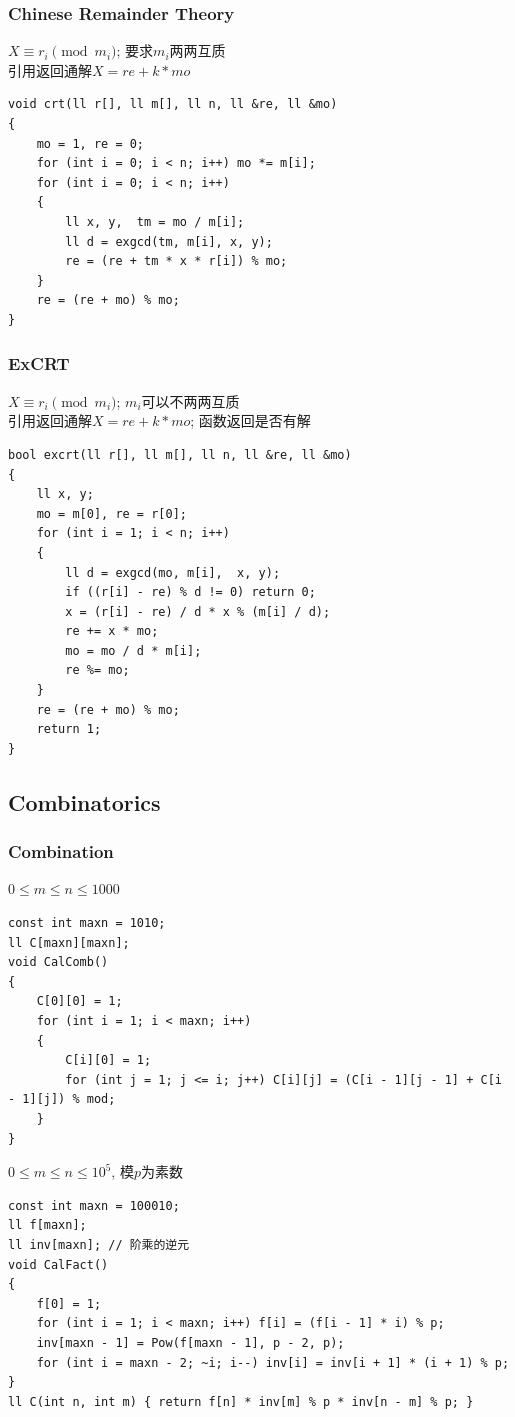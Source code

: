 \documentclass[twoside]{article}
\begin{document}
\subsubsection{Chinese Remainder Theory}

$X \equiv r_i \pmod {m_i}$; 要求$m_i$两两互质\\
引用返回通解$X = re + k * mo$
\begin{lstlisting}
void crt(ll r[], ll m[], ll n, ll &re, ll &mo)
{
    mo = 1, re = 0;
    for (int i = 0; i < n; i++) mo *= m[i];
    for (int i = 0; i < n; i++)
    {
        ll x, y,  tm = mo / m[i];
        ll d = exgcd(tm, m[i], x, y);
        re = (re + tm * x * r[i]) % mo;
    }
    re = (re + mo) % mo;
}
\end{lstlisting}
\subsubsection{ExCRT}

$X \equiv r_i \pmod {m_i}$; $m_i$可以不两两互质\\
引用返回通解$X = re + k * mo$; 函数返回是否有解
\begin{lstlisting}
bool excrt(ll r[], ll m[], ll n, ll &re, ll &mo)
{
    ll x, y;
    mo = m[0], re = r[0];
    for (int i = 1; i < n; i++)
    {
        ll d = exgcd(mo, m[i],  x, y);
        if ((r[i] - re) % d != 0) return 0;
        x = (r[i] - re) / d * x % (m[i] / d);
        re += x * mo;
        mo = mo / d * m[i];
        re %= mo;
    }
    re = (re + mo) % mo;
    return 1;
}
\end{lstlisting}
\subsection{Combinatorics}
\subsubsection{Combination}

$0 \leq m \leq n \leq 1000$
\begin{lstlisting}
const int maxn = 1010;
ll C[maxn][maxn];
void CalComb()
{
    C[0][0] = 1;
    for (int i = 1; i < maxn; i++)
    {
        C[i][0] = 1;
        for (int j = 1; j <= i; j++) C[i][j] = (C[i - 1][j - 1] + C[i - 1][j]) % mod;
    }
}

\end{lstlisting}
$0 \leq m \leq n \leq 10^5$, 模$p$为素数
\begin{lstlisting}
const int maxn = 100010;
ll f[maxn];
ll inv[maxn]; // 阶乘的逆元
void CalFact()
{
    f[0] = 1;
    for (int i = 1; i < maxn; i++) f[i] = (f[i - 1] * i) % p;
    inv[maxn - 1] = Pow(f[maxn - 1], p - 2, p);
    for (int i = maxn - 2; ~i; i--) inv[i] = inv[i + 1] * (i + 1) % p;
}
ll C(int n, int m) { return f[n] * inv[m] % p * inv[n - m] % p; }
\end{lstlisting}
\end{document}
